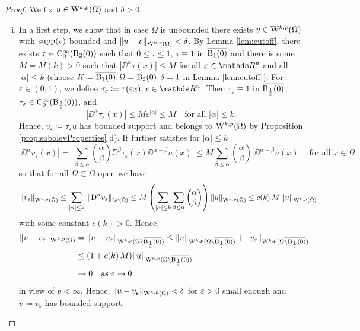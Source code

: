 \begin{proof}
  We fix $u \in \mathrm{W}^{k,p}(\Omega)$ and $\delta > 0$.
  \begin{enumerate}[i)]
    \item In a first step, we show that in case $\Omega$ is unbounded there exists $v \in \mathrm{W}^{k,p}(\Omega)$ with $\operatorname{supp}(v)$ bounded and $\|u - v\|_{\mathrm{W}^{k,p}(\Omega)} < \delta$.
      By Lemma \ref{lem:cutoff}, there exists $\tau \in \mathrm{C}_0^\infty(\mathrm{B}_2(0))$ such that $0 \leq \tau \leq 1$, $\tau \equiv 1$ in $\overline{\mathrm{B}_1(0)}$ and there is some $M = M(k) > 0$ such that $|\DD^\alpha \tau(x)| \leq M$ for all $x \in \R^n$ and all $|\alpha| \leq k$ (choose $K = \overline{\mathrm{B}_1(0)}, \Omega= \mathrm{B}_2(0), \delta = 1$ in Lemma \ref{lem:cutoff}).
      For $\varepsilon \in (0,1)$, we define $\tau_\varepsilon \coloneqq \tau(\varepsilon x), x \in \R^n$.
      Then $\tau_\varepsilon \equiv 1$ in $\overline{\mathrm{B}_{\frac{1}{\varepsilon}}(0)}$, $\tau_\varepsilon \in \mathrm{C}_0^\infty(\mathrm{B}_{\frac{2}{\varepsilon}}(0))$, and
      \begin{equation}
        |\DD^\alpha \tau_\varepsilon(x)| \leq M \varepsilon^{|\alpha|} \leq M \quad\text{for all } |\alpha| \leq k.
      \end{equation}
      Hence, $v_\varepsilon \coloneqq \tau_\varepsilon u$ has bounded support and belongs to $\mathrm{W}^{k,p}(\Omega)$ by Proposition \ref{prop:sobolevProperties} d).
      It further satisfies for $|\alpha| \leq k$
      $$
      |\DD^\alpha v_\varepsilon(x)| 
      = \Big| \sum_{\beta \leq \alpha} \binom{\alpha}{\beta} \DD^\beta \tau_\varepsilon(x) \DD^{\alpha - \beta} u(x) \Big|
      \leq M \sum_{\beta \leq \alpha} \binom{\alpha}{\beta} | \DD^{\alpha - \beta} u(x)| \quad\text{for all } x \in\Omega
      $$
      so that for all $\tilde\Omega \subset \Omega$ open we have
      $$
        \|v_\varepsilon\|_{\mathrm{W}^{k,p}(\tilde\Omega)}
        \leq \sum_{|\alpha|\leq k} \|\,{\operatorname{D}}^\alpha v_\varepsilon\|_{\mathrm{L}^p(\tilde\Omega)}
        \leq M \left( \sum_{|\alpha| \leq k} \sum_{\beta\leq\alpha} \binom{\alpha}{\beta} \right) \|u\|_{\mathrm{W}^{k,p}(\tilde\Omega)}
        \leq c(k)\, M\, \|u\|_{\mathrm{W}^{k,p}(\tilde\Omega)}
      $$
      with some constant $c(k) > 0$.
      Hence,
      \begin{align*}
        \|u - v_\varepsilon\|_{\mathrm{W}^{k,p}(\Omega)}
        &= \|u - v_\varepsilon\|_{\mathrm{W}^{k,p}(\Omega \setminus \overline{\mathrm{B}_{\frac{1}{\varepsilon}}(0)})}
        \leq \|u\|_{\mathrm{W}^{k,p}(\Omega \setminus \overline{\mathrm{B}_{\frac{1}{\varepsilon}}(0)})} + \|v_\varepsilon\|_{\mathrm{W}^{k,p}(\Omega \overline{\setminus \mathrm{B}_{\frac{1}{\varepsilon}}(0)})} \\
        &\leq (1 + c(k)\, M) \|u\|_{\mathrm{W}^{k,p}(\Omega \setminus \overline{\mathrm{B}_{\frac{1}{\varepsilon}}(0)})} \\
        &\to 0 \quad\text{as } \varepsilon \to 0
      \end{align*}
      in view of $p < \infty$.
      Hence, $\|u - v_\varepsilon\|_{\mathrm{W}^{k,p}(\Omega)} < \delta$ for $\varepsilon > 0$ small enough and $v \coloneqq v_\varepsilon$ has bounded support.


\end{enumerate}
\end{proof}
